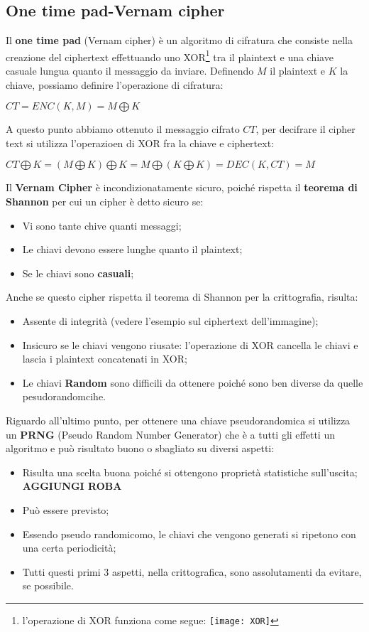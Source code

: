 \documentclass{article}
\theoremstyle{remark}
\begin{document}
\subsection{One time pad-Vernam cipher}
Il \textbf{one time pad} (Vernam cipher) è un algoritmo di cifratura che consiste nella creazione del ciphertext effettuando uno XOR\footnote{l'operazione di XOR funziona come segue: \texttt{[image: XOR]}
} tra il plaintext e una chiave casuale lungua quanto il messaggio da inviare. Definendo \(M\) il plaintext e \(K\) la chiave, possiamo definire l'operazione di cifratura:
\begin{center}
    \(CT=ENC(K,M)=M\bigoplus K\)
\end{center}
A questo punto abbiamo ottenuto il messaggio cifrato \(CT\), per decifrare il cipher text si utilizza l'operazioen di XOR fra la chiave e ciphertext:
\begin{center}
    $CT\bigoplus K=(M\bigoplus K)\bigoplus K=M\bigoplus (K\bigoplus K)=DEC(K,CT)=M$
\end{center}
Il \textbf{ Vernam Cipher} è incondizionatamente sicuro, poiché rispetta il \textbf{teorema di Shannon} per cui un cipher è detto sicuro se:
\begin{itemize}
    \item Vi sono tante chive quanti messaggi;
    \item Le chiavi devono essere lunghe quanto il plaintext;
    \item Se le chiavi sono \textbf{casuali};
\end{itemize}
Anche se questo cipher rispetta il teorema di Shannon per la crittografia, risulta:
\begin{itemize}
    \item Assente di integrità (vedere l'esempio sul ciphertext dell'immagine);
    \item Insicuro se le chiavi vengono riusate: l'operazione di XOR cancella le chiavi e lascia i plaintext concatenati in XOR\@;
    \item Le chiavi \textbf{Random} sono difficili da ottenere poiché sono ben diverse da quelle pesudorandomcihe.
\end{itemize}
Riguardo all'ultimo punto, per ottenere una chiave pseudorandomica si utilizza un \textbf{PRNG} (Pseudo Random Number Generator) che è a tutti gli effetti un algoritmo e può risultato buono o sbagliato su diversi aspetti:
\begin{itemize}
    \item Risulta una scelta buona poiché si ottengono proprietà statistiche sull'uscita;\newline
    \textbf{AGGIUNGI ROBA}
    \item Può essere previsto;
    \item Essendo pseudo randomicomo, le chiavi che vengono generati si ripetono con una certa periodicità;
    \item Tutti questi primi 3 aspetti, nella crittografica, sono assolutamenti da evitare, se possibile.
\end{itemize}
\end{document}
